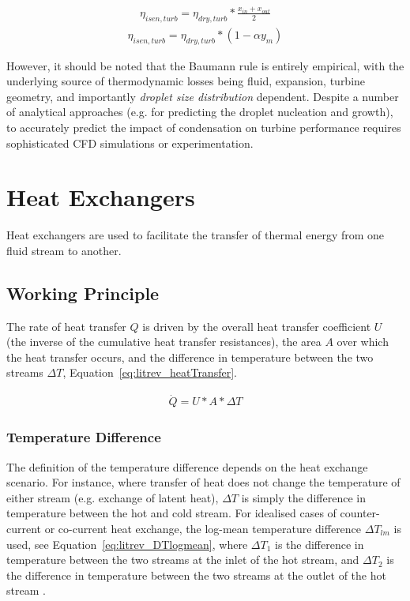         \begin{align}
            \eta_{isen, turb} = \eta_{dry, turb} * \frac{x_{in} + x_{out}}{2} \label{eq:litrev_Baumann}
        \end{align}
        \begin{align}
            \eta_{isen, turb} = \eta_{dry, turb} * (1-\alpha y_m) \label{eq:litrev_alternateBaumann}
        \end{align}

        However, it should be noted that the Baumann rule is entirely empirical, with the underlying source of thermodynamic losses being fluid, expansion, turbine geometry, and importantly \emph{droplet size distribution} dependent. Despite a number of analytical approaches (e.g. for predicting the droplet nucleation and growth), to accurately predict the impact of condensation on turbine performance requires sophisticated CFD simulations or experimentation\cite{Senoo2017}.


\section{Heat Exchangers}
    Heat exchangers are used to facilitate the transfer of thermal energy from one fluid stream to another. 
    
    \subsection{Working Principle}
    The rate of heat transfer \(Q\) is driven by the overall heat transfer coefficient \(U\) (the inverse of the cumulative heat transfer resistances), the area \(A\) over which the heat transfer occurs, and the difference in temperature between the two streams \(\Delta T\), Equation~\ref{eq:litrev_heatTransfer}.

    \begin{align}
        \Dot{Q} = U * A * \Delta T \label{eq:litrev_heatTransfer}
    \end{align}

    \subsubsection{Temperature Difference}
    The definition of the temperature difference depends on the heat exchange scenario. For instance, where transfer of heat does not change the temperature of either stream (e.g. exchange of latent heat), \(\Delta T\) is simply the difference in temperature between the hot and cold stream. For idealised cases of counter-current or co-current heat exchange, the log-mean temperature difference \(\Delta T_{lm}\) is used, see Equation~\ref{eq:litrev_DTlogmean}, where \(\Delta T_1\) is the difference in temperature between the two streams at the inlet of the hot stream, and \(\Delta T_2\) is the difference in temperature between the two streams at the outlet of the hot stream \cite{Smith2005}.
    
